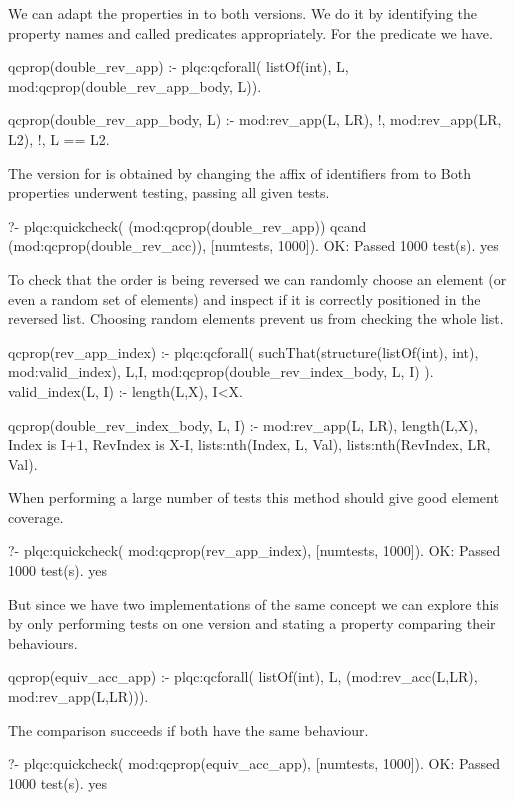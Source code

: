 We can adapt the properties in  to both versions.
%
We do it by identifying the property names and called predicates
appropriately.
%
For the  predicate we have.
\begin{yapcode}
 qcprop(double_rev_app) :-
   plqc:qcforall( listOf(int), L,
     mod:qcprop({double_rev_app_body, L})).

 qcprop({double_rev_app_body, L}) :- 
   mod:rev_app(L, LR),
   !, %
   mod:rev_app(LR, L2), !, L == L2.
\end{yapcode}
%
The version for  is obtained by changing the affix of
identifiers from  to 
%
Both properties underwent testing, passing all given tests.
%
\begin{yapcode}
   ?- plqc:quickcheck(
          (mod:qcprop(double_rev_app))
        qcand (mod:qcprop(double_rev_acc)),
          [{numtests, 1000}]).
 OK: Passed 1000 test(s).
 yes
\end{yapcode}


To check that the order is being reversed we can randomly choose an
element (or even a random set of elements) and inspect if it is
correctly positioned in the reversed list.
%
Choosing random elements prevent us from checking the whole list.
%
\begin{yapcode}
 qcprop(rev_app_index) :-
   plqc:qcforall(
     suchThat(structure({listOf(int), int}),
       mod:valid_index),
     {L,I},
     mod:qcprop({double_rev_index_body, L, I})
   ).
 valid_index({L, I}) :-
   length(L,X), I<X.

 qcprop({double_rev_index_body, L, I}) :- 
   mod:rev_app(L, LR),
   length(L,X),
   Index is I+1, RevIndex is X-I,
   lists:nth(Index, L, Val),
   lists:nth(RevIndex, LR, Val).
\end{yapcode}
%
When performing a large number of tests this method should give good
element coverage.
%
\begin{yapcode}
   ?- plqc:quickcheck(
        mod:qcprop(rev_app_index),
        [{numtests, 1000}]).
 OK: Passed 1000 test(s).
 yes
\end{yapcode}


But since we have two implementations of the same concept we can explore
this by only performing tests on one version and stating a property
comparing their behaviours.
%
\begin{yapcode}
 qcprop(equiv_acc_app) :-
   plqc:qcforall( listOf(int), L,
     (mod:rev_acc(L,LR), mod:rev_app(L,LR))).
\end{yapcode}
The comparison succeeds if both have the same behaviour.
%
\begin{yapcode}
   ?- plqc:quickcheck(
        mod:qcprop(equiv_acc_app),
        [{numtests, 1000}]).
 OK: Passed 1000 test(s).
 yes
\end{yapcode}

